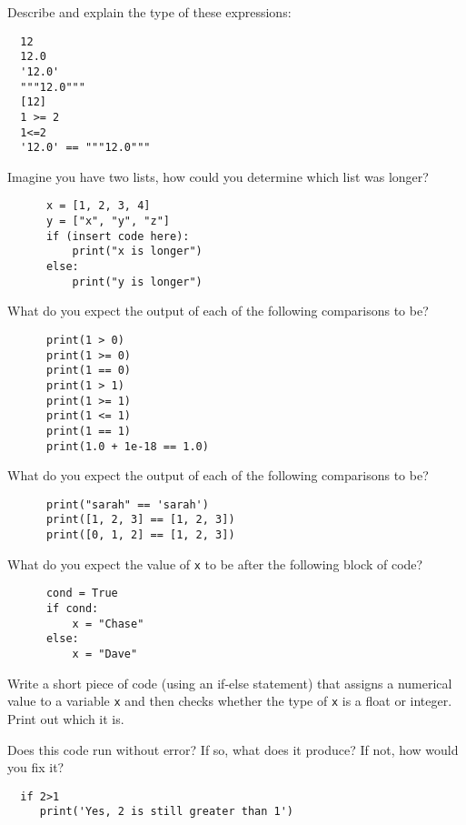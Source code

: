 \documentclass[11pt]{exam}
\begin{document}
\begin{questions}
  \item Describe and explain the type of these expressions:
  \begin{verbatim}
  12
  12.0
  '12.0'
  """12.0"""
  [12]
  1 >= 2
  1<=2
  '12.0' == """12.0"""
  \end{verbatim}


 \item Imagine you have two lists, how could you determine which list was longer?
    \begin{verbatim}
      x = [1, 2, 3, 4]
      y = ["x", "y", "z"]
      if (insert code here):
          print("x is longer")
      else:
          print("y is longer")
    \end{verbatim}

  \item What do you expect the output of each of the following comparisons to be?
    \begin{verbatim}
      print(1 > 0)
      print(1 >= 0)
      print(1 == 0)
      print(1 > 1)
      print(1 >= 1)
      print(1 <= 1)
      print(1 == 1)
      print(1.0 + 1e-18 == 1.0)
    \end{verbatim}

  \item What do you expect the output of each of the following comparisons to be?
    \begin{verbatim}
      print("sarah" == 'sarah')
      print([1, 2, 3] == [1, 2, 3])
      print([0, 1, 2] == [1, 2, 3])
    \end{verbatim}

  \item What do you expect the value of \texttt{x} to be after the following block of code?
    \begin{verbatim}
      cond = True
      if cond:
          x = "Chase"
      else:
          x = "Dave"
    \end{verbatim}

  \item Write a short piece of code (using an if-else statement) that assigns a numerical value to a variable \texttt{x} and then checks whether the type of \texttt{x} is a float or integer. Print out which it is.

  \item
  Does this code run without error?  If so, what does it produce?  If not, how would you fix it?
  \begin{verbatim}
  if 2>1
     print('Yes, 2 is still greater than 1')
  \end{verbatim}



\end{questions}
\end{document}
